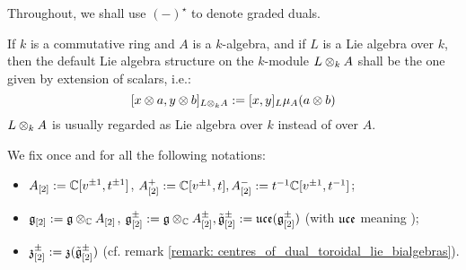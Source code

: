         \begin{convention}
            Throughout, we shall use $(-)^{\star}$ to denote graded duals. 
        \end{convention}

        \begin{convention}
            If $k$ is a commutative ring and $A$ is a $k$-algebra, and if $L$ is a Lie algebra over $k$, then the default Lie algebra structure on the $k$-module $L \tensor_k A$ shall be the one given by extension of scalars, i.e.:
                $$[x \tensor a, y \tensor b]_{L \tensor_k A} := [x, y]_L \mu_A(a \tensor b)$$
            $L \tensor_k A$ is usually regarded as Lie algebra over $k$ instead of over $A$.  
        \end{convention}

        \begin{convention} \label{conv: multiloop_algebras}
            We fix once and for all the following notations:
            \begin{itemize}
                \item $A_{[2]} := \mathbb{C}[v^{\pm 1}, t^{\pm 1}]$, $A_{[2]}^+ := \mathbb{C}[v^{\pm 1}, t], A_{[2]}^- := t^{-1}\mathbb{C}[v^{\pm 1}, t^{-1}]$;
                \item $\g_{[2]} := \g \tensor_{\bbC} A_{[2]}$, $\g_{[2]}^{\pm} := \g \tensor_{\bbC} A_{[2]}^{\pm}, \tilde{\g}_{[2]}^{\pm} := \uce(\g_{[2]}^{\pm})$ (with $\mathfrak{uce}$ meaning );
                \item $\mathfrak{z}_{[2]}^{\pm} := \mathfrak{z}(\tilde{\mathfrak{g}}_{[2]}^{\pm})$ (cf. remark \ref{remark: centres_of_dual_toroidal_lie_bialgebras}).
            \end{itemize}
        \end{convention}
    
